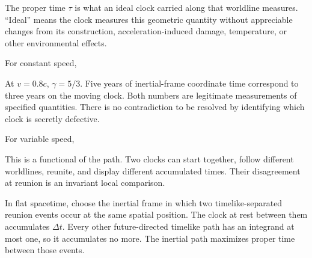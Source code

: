 \documentclass[
  11pt,
  letterpaper,
  oneside,
  openany]{scrbook}
\begin{document}
\begin{center}
\begingroup
{}
\ifdim\wd\grmathbox>\linewidth
\resizebox{\linewidth}{!}{\usebox{\grmathbox}}
\else\usebox{\grmathbox}\fi
\endgroup
\end{center}

The proper time \(\tau\) is what an ideal clock carried along that
worldline measures. ``Ideal'' means the clock measures this geometric
quantity without appreciable changes from its construction,
acceleration-induced damage, temperature, or other environmental
effects.

For constant speed,

\begin{center}
\begingroup
{}
\ifdim\wd\grmathbox>\linewidth
\resizebox{\linewidth}{!}{\usebox{\grmathbox}}
\else\usebox{\grmathbox}\fi
\endgroup
\end{center}

At \(v=0.8c\), \(\gamma=5/3\). Five years of inertial-frame coordinate
time correspond to three years on the moving clock. Both numbers are
legitimate measurements of specified quantities. There is no
contradiction to be resolved by identifying which clock is secretly
defective.

For variable speed,

\begin{center}
\begingroup
{}
\ifdim\wd\grmathbox>\linewidth
\resizebox{\linewidth}{!}{\usebox{\grmathbox}}
\else\usebox{\grmathbox}\fi
\endgroup
\end{center}

This is a functional of the path. Two clocks can start together, follow
different worldlines, reunite, and display different accumulated times.
Their disagreement at reunion is an invariant local comparison.

In flat spacetime, choose the inertial frame in which two
timelike-separated reunion events occur at the same spatial position.
The clock at rest between them accumulates \(\Delta t\). Every other
future-directed timelike path has an integrand at most one, so it
accumulates no more. The inertial path maximizes proper time between
those events.
\end{document}
